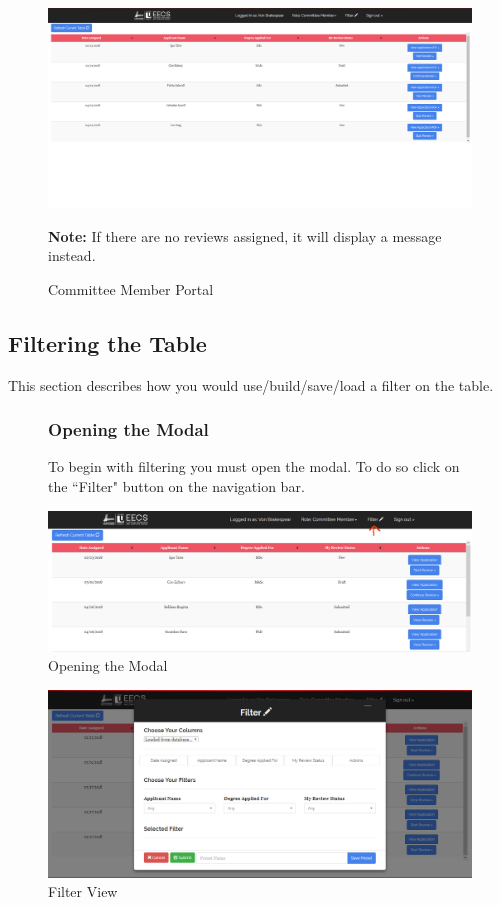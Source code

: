 \documentclass[fontsize=12pt,paper=letter,twoside]{scrartcl}
\begin{document}
\begin{figure}[!htb]
\begin{center}
\includegraphics[width=.8\textwidth]{images/cm/default_table.png}
\end{center}
\caption{Committee Member Portal}
\label{fig:cm:cm_portal}
\textbf{Note:} If there are no reviews assigned, it will display a message instead. 
\end{figure}

\newpage
\subsection{Filtering the Table}
This section describes how you would use/build/save/load a filter on the table.
\begin{figure}[!htb]
\subsubsection{Opening the Modal}
To begin with filtering you must open the modal. To do so click on the ``Filter" button on the navigation bar.
\begin{center}
\includegraphics[width=.99\textwidth]{images/cm/open_modal.png}
\end{center}
\caption{Opening the  Modal}
\label{fig:cm:open_modal}
\end{figure}

\begin{figure}[!htb]
\begin{center}
\includegraphics[width=.99\textwidth]{images/cm/default_filter_view.png}
\end{center}
\caption{Filter View}
\label{fig:cm:filter_view}
\end{figure}
\end{document}
